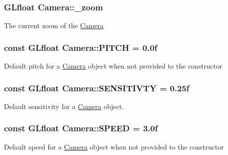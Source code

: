 \subsubsection[{\texorpdfstring{\+\_\+zoom}{_zoom}}]{\setlength{\rightskip}{0pt plus 5cm}G\+Lfloat Camera\+::\+\_\+zoom}\hypertarget{classCamera_a99dc4d95f58be2427ff6c8d93c676ecd}{}\label{classCamera_a99dc4d95f58be2427ff6c8d93c676ecd}
The current zoom of the \hyperlink{classCamera}{Camera} 
\subsubsection[{\texorpdfstring{P\+I\+T\+CH}{PITCH}}]{\setlength{\rightskip}{0pt plus 5cm}const G\+Lfloat Camera\+::\+P\+I\+T\+CH = 0.\+0f\hspace{0.3cm}{\ttfamily [static]}}\hypertarget{classCamera_afd43f32a47d2db8922dc32030fd84379}{}\label{classCamera_afd43f32a47d2db8922dc32030fd84379}
Default pitch for a \hyperlink{classCamera}{Camera} object when not provided to the constructor 
\subsubsection[{\texorpdfstring{S\+E\+N\+S\+I\+T\+I\+V\+TY}{SENSITIVTY}}]{\setlength{\rightskip}{0pt plus 5cm}const G\+Lfloat Camera\+::\+S\+E\+N\+S\+I\+T\+I\+V\+TY = 0.\+25f\hspace{0.3cm}{\ttfamily [static]}}\hypertarget{classCamera_ad682c7fc69bab5dbc3f8f10a1542b484}{}\label{classCamera_ad682c7fc69bab5dbc3f8f10a1542b484}
Default sensitivity for a \hyperlink{classCamera}{Camera} object. 
\subsubsection[{\texorpdfstring{S\+P\+E\+ED}{SPEED}}]{\setlength{\rightskip}{0pt plus 5cm}const G\+Lfloat Camera\+::\+S\+P\+E\+ED = 3.\+0f\hspace{0.3cm}{\ttfamily [static]}}\hypertarget{classCamera_acc2ddbb4a3bdb2829896703edf72ca1e}{}\label{classCamera_acc2ddbb4a3bdb2829896703edf72ca1e}
Default speed for a \hyperlink{classCamera}{Camera} object when not provided to the constructor 
